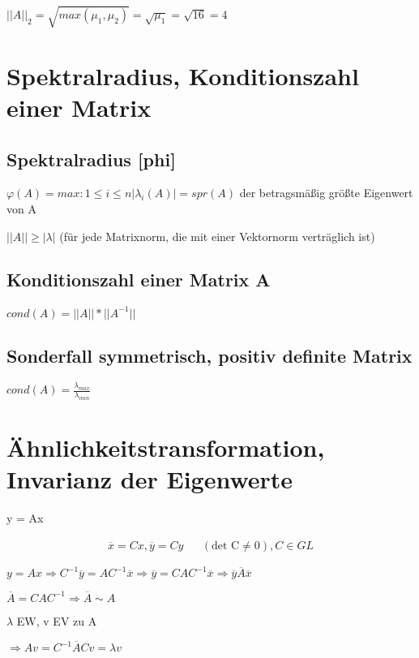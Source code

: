 \documentclass[12pt,a4paper]{article} %
\newcommand*\conj[1]{\overline{#1}}
\begin{document}
	$||A||_2 = \sqrt{max(\mu_1, \mu_2)} = \sqrt{\mu_1} = \sqrt{16} = 4$
	
	\newpage
	
	\section{Spektralradius, Konditionszahl einer Matrix}
	
	\subsection{Spektralradius [phi]}
	
	$\varphi(A) = max:{1 \le i \le n} |\lambda_i(A)| = spr(A)$ der betragsmäßig größte Eigenwert von A
	
	$||A|| \ge |\lambda|$ (für jede Matrixnorm, die mit einer Vektornorm verträglich ist)
	
	\subsection{Konditionszahl einer Matrix A}
	
	$cond(A) = ||A||*||A^{-1}||$
	
	\subsection{Sonderfall symmetrisch, positiv definite Matrix}
	
	$cond(A) = \frac{ \lambda_{max}}{ \lambda_{min}}$
	
	\newpage
	
	\section{Ähnlichkeitstransformation, Invarianz der Eigenwerte}
	
	y = Ax
	
	\begin{align*}
		\conj{x} = Cx, \conj{y} = Cy && (\text{det C} \ne 0), C \in GL
	\end{align*}
	
	
	$y = Ax \Rightarrow C^{-1} \conj{y} = AC^{-1} \conj{x} \Rightarrow \conj{y} = CAC^{-1} \conj{x} \Rightarrow \conj{y}\conj{A}\conj{x}$
	
	$\conj{A} = CAC^{-1} \Rightarrow \conj{A} \sim A$
	
	$\lambda$ EW, v EV zu A
	
	$\Rightarrow Av = C^{-1}\conj{A}Cv = \lambda v$
	
\end{document}
